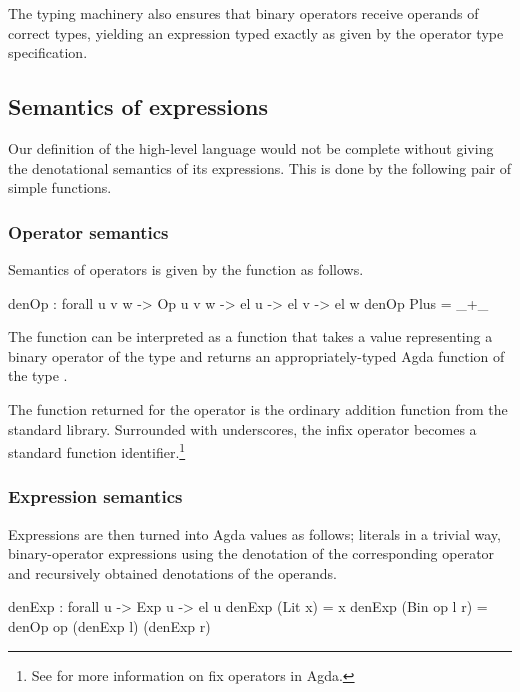 The typing machinery also ensures that binary operators receive operands of correct
types, yielding an expression typed exactly as given by the operator type specification.

\subsection{Semantics of expressions}

Our definition of the high-level language would not be complete without giving
the denotational semantics of its expressions. This is done by the following
pair of simple functions.

\subsubsection{Operator semantics}

Semantics of operators is given by the function  as follows.

\begin{code}
  denOp : forall {u v w} -> Op u v w -> el u -> el v -> el w
  denOp Plus = _+\_
\end{code}

\noindent The function  can be interpreted as a function that takes a value
representing a binary operator of the type  and returns an appropriately-typed Agda
function of the type .

The function returned for the operator  is the ordinary addition function
from the standard library. Surrounded with underscores, the infix operator \ident{+} becomes
a standard function identifier.\footnote{See  for more information on
\textvisiblespace\hspace{0.8pt}fix operators in Agda.}

\subsubsection{Expression semantics}

Expressions are then turned into Agda values as follows; literals in a trivial
way, binary-operator expressions using the denotation of the corresponding
operator and recursively obtained denotations of the operands.

\begin{code}
  denExp : forall {u} -> Exp u -> el u
  denExp (Lit x) = x
  denExp (Bin op l r) = denOp op (denExp l) (denExp r)
\end{code}\label{sec:simple-denExp}

